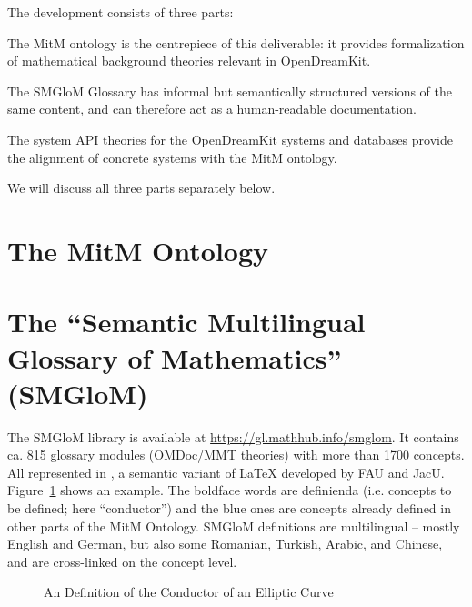 \documentclass[book]{deliverablereport}
\begin{document}
The development consists of three parts:
\begin{compactenum}[\em i\rm)]
\item The MitM ontology is the centrepiece of this deliverable: it provides formalization of mathematical background theories relevant in OpenDreamKit.
\item The SMGloM Glossary has informal but semantically structured versions of the same content, and can therefore act as a human-readable documentation.
\item The system API theories for the OpenDreamKit systems and databases provide the alignment of concrete systems with the MitM ontology.
\end{compactenum}
We will discuss all three parts separately below.

\section{The MitM Ontology}



\section{The ``Semantic Multilingual Glossary of Mathematics'' (SMGloM)}\label{sec:smglom}

The SMGloM library is available at \url{https://gl.mathhub.info/smglom}. It contains
ca. 815 glossary modules (OMDoc/MMT theories) with more than 1700 concepts. All
represented in \sTeX, a semantic variant of {\LaTeX} developed by FAU and
JacU. Figure~\ref{fig:conductor} shows an example. The boldface words are definienda
(i.e. concepts to be defined; here ``conductor'') and the blue ones are concepts already
defined in other parts of the MitM Ontology. SMGloM definitions are multilingual -- mostly
English and German, but also some Romanian, Turkish, Arabic, and Chinese, and are
cross-linked on the concept level.

\begin{figure}[ht]\centering
  \caption{An \sTeX Definition of the Conductor of an Elliptic
    Curve}\label{fig:conductor}
\end{figure}
\end{document}

